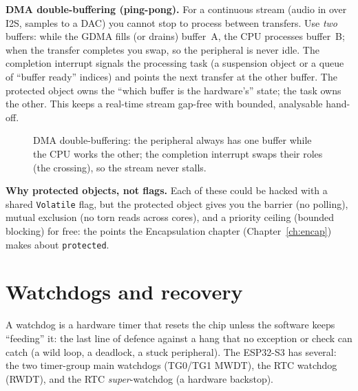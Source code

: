 \textbf{DMA double-buffering (ping-pong).} For a continuous stream (audio in
over I2S, samples to a DAC) you cannot stop to process between transfers. Use
\emph{two} buffers: while the GDMA fills (or drains) buffer~A, the CPU processes
buffer~B; when the transfer completes you swap, so the peripheral is never idle.
The completion interrupt signals the processing task (a suspension object or a
queue of ``buffer ready'' indices) and points the next transfer at the other
buffer. The protected object owns the ``which buffer is the hardware's'' state;
the task owns the other. This keeps a real-time stream gap-free with bounded,
analysable hand-off.

\begin{figure}[ht]
\centering
{}
\caption{DMA double-buffering: the peripheral always has one buffer while the CPU
works the other; the completion interrupt swaps their roles (the crossing), so the
stream never stalls.}
\label{fig:pingpong}
\end{figure}

\textbf{Why protected objects, not flags.} Each of these could be hacked with a
shared \texttt{Volatile} flag, but the protected object gives you the barrier (no
polling), mutual exclusion (no torn reads across cores), and a priority ceiling
(bounded blocking) for free: the points the Encapsulation chapter
(Chapter~\ref{ch:encap}) makes about \texttt{protected}.

\section{Watchdogs and recovery}
\label{sec:watchdogs}

A watchdog is a hardware timer that resets the chip unless the software keeps
``feeding'' it: the last line of defence against a hang that no exception or
check can catch (a wild loop, a deadlock, a stuck peripheral). The ESP32-S3 has
several: the two timer-group main watchdogs (TG0/TG1 MWDT), the RTC watchdog
(RWDT), and the RTC \emph{super}-watchdog (a hardware backstop).

